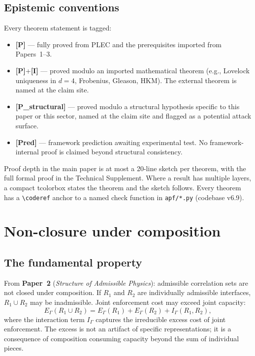\documentclass[11pt]{article}
\newcommand{\epitag}[1]{\textbf{[#1]}}
\newcommand{\paperref}[2]{\textbf{Paper~#1} (\textit{#2})}
\theoremstyle{definition}
\begin{document}
\subsection{Epistemic conventions}\label{sec:inputs_epistemic}

Every theorem statement is tagged:

\begin{itemize}
    \item \epitag{P} --- fully proved from PLEC and the prerequisites imported from Papers~1--3.
    \item \epitag{P}+\epitag{I} --- proved modulo an imported mathematical theorem (e.g., Lovelock uniqueness in $d=4$, Frobenius, Gleason, HKM). The external theorem is named at the claim site.
    \item \epitag{P\_structural} --- proved modulo a structural hypothesis specific to this paper or this sector, named at the claim site and flagged as a potential attack surface.
    \item \epitag{Pred} --- framework prediction awaiting experimental test. No framework-internal proof is claimed beyond structural consistency.
\end{itemize}

Proof depth in the main paper is at most a 20-line sketch per theorem, with the full formal proof in the Technical Supplement. Where a result has multiple layers, a compact tcolorbox states the theorem and the sketch follows. Every theorem has a \texttt{\textbackslash coderef} anchor to a named check function in \texttt{apf/*.py} (codebase v6.9).

\clearpage

\section{Non-closure under composition}\label{sec:non_closure}

\subsection{The fundamental property}\label{sec:non_closure_fundamental}

From \paperref{2}{Structure of Admissible Physics}: admissible correlation sets are not closed under composition. If $R_1$ and $R_2$ are individually admissible interfaces, $R_1 \cup R_2$ may be inadmissible. Joint enforcement cost may exceed joint capacity:
\[
E_\Gamma(R_1 \cup R_2) = E_\Gamma(R_1) + E_\Gamma(R_2) + I_\Gamma(R_1, R_2),
\]
where the interaction term $I_\Gamma$ captures the irreducible excess cost of joint enforcement. The excess is not an artifact of specific representations; it is a consequence of composition consuming capacity beyond the sum of individual pieces.
\end{document}
